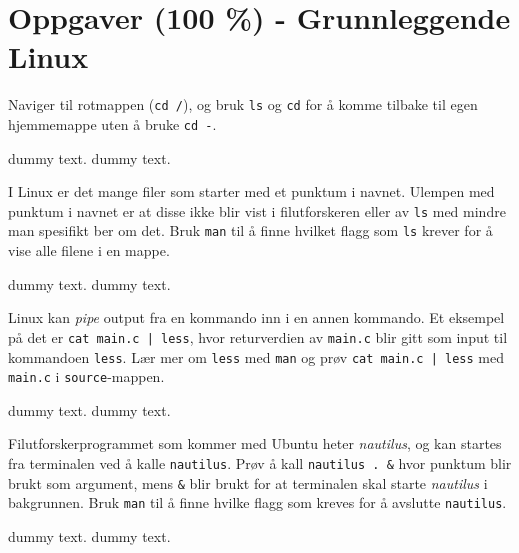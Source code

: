 \section{Oppgaver (100 \%) - Grunnleggende Linux}\label{sec:3-oppgave}


\begin{subprob}
    Naviger til rotmappen (\verb|cd /|), og bruk \verb|ls| og \verb|cd| for å komme tilbake til egen hjemmemappe uten å bruke \verb|cd -|.
	\begin{solution}
	    dummy text. dummy text. 
	\end{solution}
\end{subprob}

\begin{subprob}
    I Linux er det mange filer som starter med et punktum i navnet. Ulempen med punktum i navnet er at disse ikke blir vist i filutforskeren eller av \verb|ls| med mindre man spesifikt ber om det. Bruk \verb|man| til å finne hvilket flagg som \verb|ls| krever for å vise alle filene i en mappe. 
	\begin{solution}
	    dummy text. dummy text. 
	\end{solution}
\end{subprob}

\begin{subprob}
    Linux kan \textit{pipe} output fra en kommando inn i en annen kommando. Et eksempel på det er \texttt{cat main.c | less}, hvor returverdien av \verb|main.c| blir gitt som input til kommandoen \verb|less|. Lær mer om \verb|less| med \verb|man| og prøv \texttt{cat main.c | less} med \verb|main.c| i \verb|source|-mappen.
    
	\begin{solution}
	    dummy text. dummy text. 
	\end{solution}
\end{subprob}

\begin{subprob}
    Filutforskerprogrammet som kommer med Ubuntu heter \textit{nautilus}, og kan startes fra terminalen ved å kalle \verb|nautilus|. Prøv å kall \verb|nautilus . &| hvor punktum blir brukt som argument, mens \verb|&| blir brukt for at terminalen skal starte \textit{nautilus} i bakgrunnen. Bruk \verb|man| til å finne hvilke flagg som kreves for å avslutte \verb|nautilus|.
    \begin{solution}
        dummy text. dummy text. 
	\end{solution}
\end{subprob}

